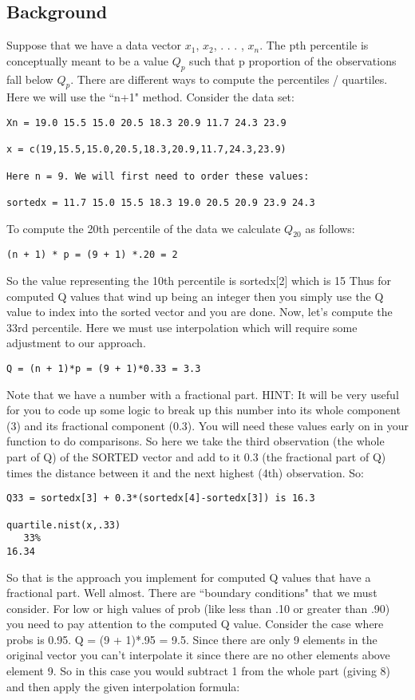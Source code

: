 \documentclass{article}
\begin{document}
\subsection{Background}
Suppose that we have a data vector $x_1$, $x_2$, . . . , $x_n$. The pth percentile is conceptually meant to be a value $Q_p$ such that p proportion of the observations fall below $Q_p$. There are different ways to compute the percentiles / quartiles. Here we will use the ``n+1" method. Consider the data set:
\begin{verbatim}
Xn = 19.0 15.5 15.0 20.5 18.3 20.9 11.7 24.3 23.9  

x = c(19,15.5,15.0,20.5,18.3,20.9,11.7,24.3,23.9)

Here n = 9. We will first need to order these values:

sortedx = 11.7 15.0 15.5 18.3 19.0 20.5 20.9 23.9 24.3

\end{verbatim}
\noindent
To compute the 20th  percentile of the data we calculate $Q_{20}$ as follows:
\begin{verbatim}
(n + 1) * p = (9 + 1) *.20 = 2
\end{verbatim}
\noindent
So the value representing the 10th percentile is sortedx[2] which is 15
Thus for computed Q values that wind up being an integer then you simply use the Q value to index into the sorted vector and you are done. Now, let's compute the 33rd percentile. Here we must use interpolation which will require some adjustment to our approach.
\begin{verbatim}
Q = (n + 1)*p = (9 + 1)*0.33 = 3.3 
\end{verbatim}
\noindent
Note that we have a number with a fractional part. HINT: It will be very useful for you to code up some logic to break up this number into its whole component (3) and its fractional component (0.3). You will need these values early on in your function to do comparisons. So here we take the third observation (the whole part of Q) of the SORTED vector and add to it 0.3 (the fractional part of Q) times the distance between it and the next highest (4th) observation. So:
\begin{verbatim}
Q33 = sortedx[3] + 0.3*(sortedx[4]-sortedx[3]) is 16.3

quartile.nist(x,.33)
   33% 
16.34 
\end{verbatim}
\noindent
So that is the approach you implement for computed Q values that have a fractional part. Well almost. There are ``boundary conditions" that we must consider. For low or high values of prob (like less than .10 or greater than .90) you need to pay attention to the computed Q value. Consider the case where probs is 0.95. Q = (9 + 1)*.95 = 9.5. Since there are only 9 elements in the original vector you can't interpolate it since there are no other elements above element 9. So in this case you would subtract 1 from the whole part (giving 8) and then apply the given interpolation formula:
\end{document}
